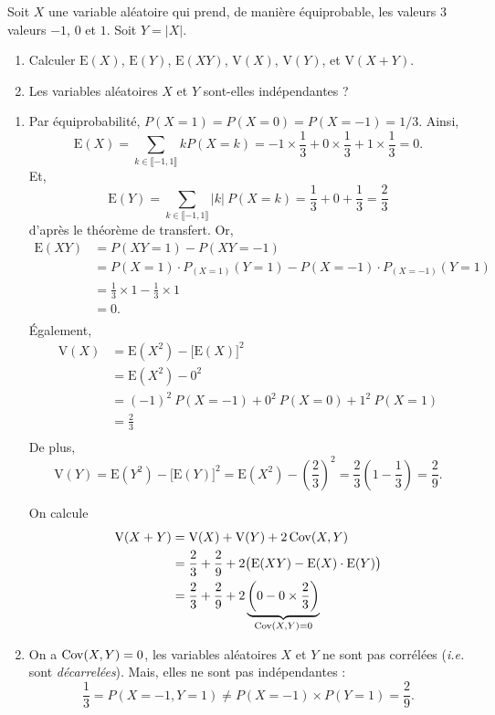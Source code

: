 \begin{exo}
	\begin{slshape}
		Soit $X$ une variable aléatoire qui prend, de manière équiprobable, les valeurs 3 valeurs $-1$, $0$ et $1$. Soit $Y = |X|$.
		\begin{enumerate}
			\item Calculer $\mathrm{E}(X)$, $\mathrm{E}(Y)$, $\mathrm{E}(XY)$, $\mathrm{V}(X)$, $\mathrm{V}(Y)$, et $\mathrm{V}(X+Y)$.
			\item Les variables aléatoires $X$ et $Y$ sont-elles indépendantes ?
		\end{enumerate}
	\end{slshape}

	\begin{enumerate}
		\item
			Par équiprobabilité, $P(X = 1) = P(X = 0) = P(X = -1) = 1/3$. Ainsi, \[
				\mathrm{E}(X) = \sum_{k \in \llbracket -1,1 \rrbracket} k P(X = k) = -1 \times \frac{1}{3} + 0 \times \frac{1}{3} + 1 \times \frac{1}{3} = 0
			.\] Et, \[
				\mathrm{E}(Y) = \sum_{k \in \llbracket -1,1 \rrbracket} |k|\:P(X = k) = \frac{1}{3} + 0 + \frac{1}{3} = \frac{2}{3}
			\]d'après le théorème de transfert. Or,
			\begin{align*}
				\mathrm{E}(XY) &= P(XY = 1) - P(XY = -1)\\
				&= P(X = 1) \cdot P_{(X = 1)}(Y = 1) - P(X = -1) \cdot P_{(X = -1)}(Y = 1) \\
				&= \frac{1}{3} \times 1 - \frac{1}{3} \times 1 \\
				&= 0. \\
			\end{align*}
			Également,
			\begin{align*}
				\mathrm{V}(X) &= \mathrm{E}(X^2) - \big[\mathrm{E}(X)\big]^2\\
				&= \mathrm{E}(X^2) - 0^2 \\
				&= (-1)^2\: P(X = -1) + 0^2\:P(X = 0) + 1^2\:P(X = 1) \\
				&= \frac{2}{3} \\
			\end{align*}
			De plus, \[
				\mathrm{V}(Y) = \mathrm{E}(Y^2) - \big[\mathrm{E}(Y)\big]^2 = \mathrm{E}(X^2) - \left( \frac{2}{3} \right)^2 = \frac{2}{3} \left( 1 - \frac{1}{3} \right)  = \frac{2}{9}
			.\]

			On calcule
			\begin{align*}
				\mathrm{V}(X + Y) &= \mathrm{V}(X) + \mathrm{V}(Y) + 2\operatorname{Cov}(X, Y)\\
				&= \frac{2}{3} + \frac{2}{9} + 2\big(\mathrm{E}(XY) - \mathrm{E}(X)\cdot  \mathrm{E}(Y)\big) \\
				&= \frac{2}{3} + \frac{2}{9} + 2 \underbrace{\left( 0 - 0 \times \frac{2}{3} \right)}_{\operatorname{Cov}(X, Y) = 0} \\
			\end{align*}
		\item On a $\operatorname{Cov}(X, Y) = 0$, les variables aléatoires $X$ et $Y$ ne sont pas corrélées (\textit{i.e.} sont \textit{décarrelées}).
			Mais, elles ne sont pas indépendantes : \[
				\frac{1}{3} = P(X = -1, Y = 1) \neq P(X = -1) \times P(Y = 1) = \frac{2}{9}
			.\]
	\end{enumerate}
\end{exo}
